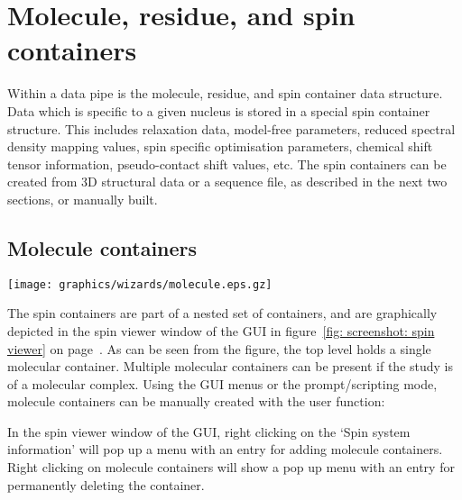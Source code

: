 
\section{Molecule, residue, and spin containers}

Within a data pipe is the molecule, residue, and spin container data structure.  Data which is specific to a given nucleus is stored in a special spin container structure.  This includes relaxation data, model-free parameters, reduced spectral density mapping values, spin specific optimisation parameters, chemical shift tensor information, pseudo-contact shift values, etc.  The spin containers can be created from 3D structural data or a sequence file, as described in the next two sections, or manually built.




\newpage
\subsection{Molecule containers}

\begin{figure*}[h]
\texttt{[image: graphics/wizards/molecule.eps.gz]}
\end{figure*}

The spin containers are part of a nested set of containers, and are graphically depicted in the spin viewer window of the GUI in figure~\ref{fig: screenshot: spin viewer} on page~\pageref{fig: screenshot: spin viewer}.  As can be seen from the figure, the top level holds a single molecular container.  Multiple molecular containers can be present if the study is of a molecular complex.  Using the GUI menus or the prompt/scripting mode, molecule containers can be manually created with the user function:


In the spin viewer window of the GUI, right clicking on the `Spin system information' will pop up a menu with an entry for adding molecule containers.  Right clicking on molecule containers will show a pop up menu with an entry for permanently deleting the container.




